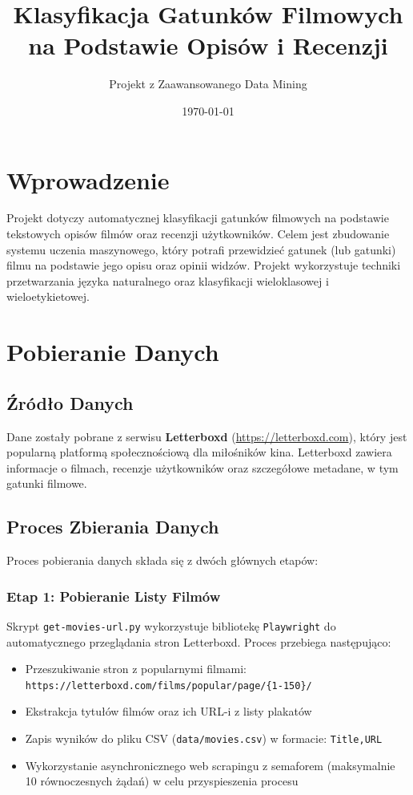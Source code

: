 \documentclass[12pt,a4paper]{article}
\title{Klasyfikacja Gatunków Filmowych na Podstawie Opisów i Recenzji}
\author{Projekt z Zaawansowanego Data Mining}
\date{\today}
\begin{document}
\maketitle

\tableofcontents
\newpage

\section{Wprowadzenie}

Projekt dotyczy automatycznej klasyfikacji gatunków filmowych na podstawie tekstowych opisów filmów oraz recenzji użytkowników. Celem jest zbudowanie systemu uczenia maszynowego, który potrafi przewidzieć gatunek (lub gatunki) filmu na podstawie jego opisu oraz opinii widzów. Projekt wykorzystuje techniki przetwarzania języka naturalnego oraz klasyfikacji wieloklasowej i wieloetykietowej.

\section{Pobieranie Danych}

\subsection{Źródło Danych}

Dane zostały pobrane z serwisu \textbf{Letterboxd} (\url{https://letterboxd.com}), który jest popularną platformą społecznościową dla miłośników kina. Letterboxd zawiera informacje o filmach, recenzje użytkowników oraz szczegółowe metadane, w tym gatunki filmowe.

\subsection{Proces Zbierania Danych}

Proces pobierania danych składa się z dwóch głównych etapów:

\subsubsection{Etap 1: Pobieranie Listy Filmów}

Skrypt \texttt{get-movies-url.py} wykorzystuje bibliotekę \texttt{Playwright} do automatycznego przeglądania stron Letterboxd. Proces przebiega następująco:

\begin{itemize}
    \item Przeszukiwanie stron z popularnymi filmami: \texttt{https://letterboxd.com/films/popular/page/\{1-150\}/}
    \item Ekstrakcja tytułów filmów oraz ich URL-i z listy plakatów
    \item Zapis wyników do pliku CSV (\texttt{data/movies.csv}) w formacie: \texttt{Title,URL}
    \item Wykorzystanie asynchronicznego web scrapingu z semaforem (maksymalnie 10 równoczesnych żądań) w celu przyspieszenia procesu
\end{itemize}
\end{document}
